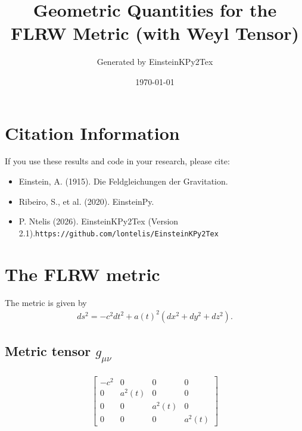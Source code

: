 \documentclass{article}
\begin{document}

\title{Geometric Quantities for the FLRW Metric (with Weyl Tensor)}
\author{Generated by EinsteinKPy2Tex}
\date{\today}
\maketitle

\section{Citation Information}
If you use these results and code in your research, please cite:
\begin{itemize}
\item Einstein, A. (1915). Die Feldgleichungen der Gravitation.
\item Ribeiro, S., et al. (2020). EinsteinPy.
\item P. Ntelis (2026). EinsteinKPy2Tex (Version 2.1).\texttt{https://github.com/lontelis/EinsteinKPy2Tex}
\end{itemize}

\section{The FLRW metric}

The metric is given by
\begin{align}
ds^2 = -c^2 dt^2 + a(t)^2 (dx^2+dy^2+dz^2).
\end{align}

\subsection{Metric tensor $g_{\mu\nu}$}
\begin{align}
\left[\begin{matrix}- c^{2} & 0 & 0 & 0\\0 & a^{2}{\left(t \right)} & 0 & 0\\0 & 0 & a^{2}{\left(t \right)} & 0\\0 & 0 & 0 & a^{2}{\left(t \right)}\end{matrix}\right]
\end{align}
\end{document}
